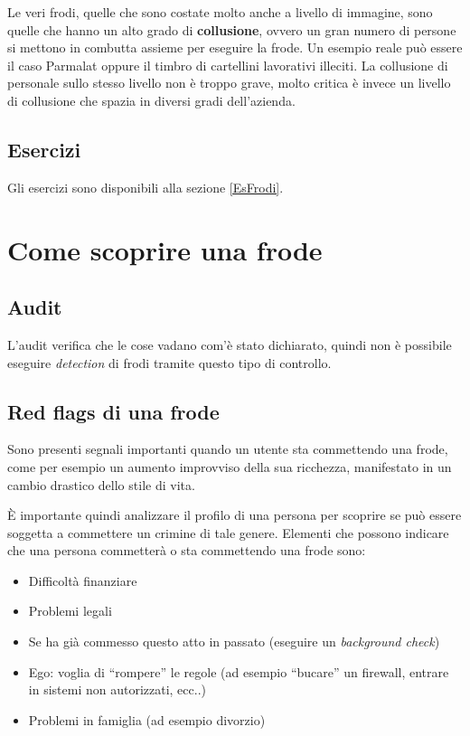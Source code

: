 Le veri frodi, quelle che sono costate molto anche a livello di immagine, sono
quelle che hanno un alto grado di \textbf{collusione}, ovvero un gran numero di
persone si mettono in combutta assieme per eseguire la frode. Un esempio 
reale può essere il caso Parmalat oppure il timbro di cartellini lavorativi 
illeciti. La collusione di personale sullo stesso livello non è troppo grave, 
molto critica è invece un livello di collusione che spazia in diversi gradi 
dell'azienda.

\subsection{Esercizi}

Gli esercizi sono disponibili alla sezione \ref{EsFrodi}.

\section{Come scoprire una frode}

\subsection{Audit}

L'audit verifica che le cose vadano com'è stato dichiarato, quindi non è
possibile eseguire \textit{detection} di frodi tramite questo tipo di controllo.

\subsection{Red flags di una frode}
Sono presenti segnali importanti quando un utente sta commettendo una frode,
come per esempio un aumento improvviso della sua ricchezza, manifestato
in un cambio drastico dello stile di vita.

È importante quindi analizzare il profilo di una persona per scoprire se può
essere soggetta a commettere un crimine di tale genere. Elementi che possono 
indicare che una persona commetterà o sta commettendo una frode sono:
\begin{itemize}
  \item Difficoltà finanziare
  \item Problemi legali
  \item Se ha già commesso questo atto in passato (eseguire un
  \textit{background check})
  \item Ego: voglia di ``rompere'' le regole (ad esempio ``bucare'' un
  firewall, entrare in sistemi non autorizzati, ecc..)
  \item Problemi in famiglia (ad esempio divorzio)
\end{itemize}

